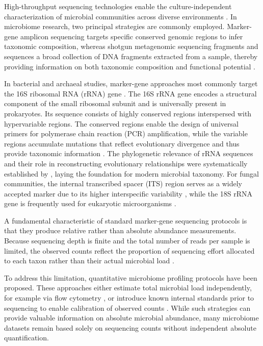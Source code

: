 High-throughput sequencing technologies enable the culture-independent characterization of microbial communities across diverse environments \citep{caporaso2012ultrahighthroughput,shendure2017dna}. In microbiome research, two principal strategies are commonly employed. Marker-gene amplicon sequencing targets specific conserved genomic regions to infer taxonomic composition, whereas shotgun metagenomic sequencing fragments and sequences a broad collection of DNA fragments extracted from a sample, thereby providing information on both taxonomic composition and functional potential \citep{sharpton2014introduction,quince2017shotgun}.

In bacterial and archaeal studies, marker-gene approaches most commonly target the 16S ribosomal RNA (rRNA) gene \citep{sanschagrin2014nextgeneration}. The 16S rRNA gene encodes a structural component of the small ribosomal subunit and is universally present in prokaryotes. Its sequence consists of highly conserved regions interspersed with hypervariable regions. The conserved regions enable the design of universal primers for polymerase chain reaction (PCR) amplification, while the variable regions accumulate mutations that reflect evolutionary divergence and thus provide taxonomic information \citep{chakravorty2007detailed}. The phylogenetic relevance of rRNA sequences and their role in reconstructing evolutionary relationships were systematically established by \citet{woese1987bacterial}, laying the foundation for modern microbial taxonomy. For fungal communities, the internal transcribed spacer (ITS) region serves as a widely accepted marker due to its higher interspecific variability \citep{schoch2012nuclear}, while the 18S rRNA gene is frequently used for eukaryotic microorganisms \citep{hadziavdic2014characterization}.

A fundamental characteristic of standard marker-gene sequencing protocols is that they produce relative rather than absolute abundance measurements. Because sequencing depth is finite and the total number of reads per sample is limited, the observed counts reflect the proportion of sequencing effort allocated to each taxon rather than their actual microbial load \citep{gloor2017microbiome}. 

To address this limitation, quantitative microbiome profiling protocols have been proposed. These approaches either estimate total microbial load independently, for example via flow cytometry \citep{props2017absolute,vandeputte2017quantitative}, or introduce known internal standards prior to sequencing to enable calibration of observed counts \citep{lin2019quantitative,stammler2016adjusting}. While such strategies can provide valuable information on absolute microbial abundance, many microbiome datasets remain based solely on sequencing counts without independent absolute quantification.

